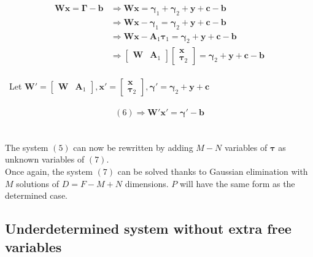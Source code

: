 \documentclass{article}
\begin{document}
\begin{equation}
    \begin{split}
        \textbf{W}\textbf{x}  =\boldsymbol{\Gamma}-\textbf{b} &\Rightarrow 
        \textbf{W}\textbf{x}  = \boldsymbol{\gamma}_{1} + \boldsymbol{\gamma}_{2} + \textbf{y} + \textbf{c} -\textbf{b}\\
         & \Rightarrow  \textbf{W}\textbf{x}-\boldsymbol{\gamma}_{1}  = \boldsymbol{\gamma}_{2}+ \textbf{y} + \textbf{c} -\textbf{b} \\
         & \Rightarrow  \textbf{W}\textbf{x}-\textbf{A}_{1}\boldsymbol{\tau}_{1}  = \boldsymbol{\gamma}_{2}+ \textbf{y} + \textbf{c} -\textbf{b} \\
         & \Rightarrow \begin{bmatrix}\textbf{W}&\textbf{A}_{1} \end{bmatrix} \begin{bmatrix}\textbf{x} \\\boldsymbol{\tau}_{2} 
        \end{bmatrix} =\boldsymbol{\gamma}_{2}+ \textbf{y} + \textbf{c}-\textbf{b}
        \end{split}
\end{equation} 
\\
\
Let $\textbf{W}'= \begin{bmatrix}\textbf{W}&\textbf{A}_{1} \end{bmatrix},\textbf{x}' = \begin{bmatrix}\textbf{x} \\\boldsymbol{\tau}_{2} \end{bmatrix},
\boldsymbol{\gamma}'=\boldsymbol{\gamma}_{2}+ \textbf{y} + \textbf{c}$
\\\\
\begin{equation}
    (6) \Rightarrow \textbf{W}'\textbf{x}' =\boldsymbol{\gamma}'-\textbf{b}
\end{equation}
\\
\\
The system $(5)$ can now be rewritten by adding $M-N$ variables of $\boldsymbol{\tau}$ as unknown variables of $(7)$.\\ 
Once again, the system $(7)$ can be solved thanks to Gaussian elimination with $M$ solutions of $D=F-M+N$ dimensions.
$P$ will have the same form as the determined case.

\subsection{Underdetermined system without extra free variables}
\end{document}
